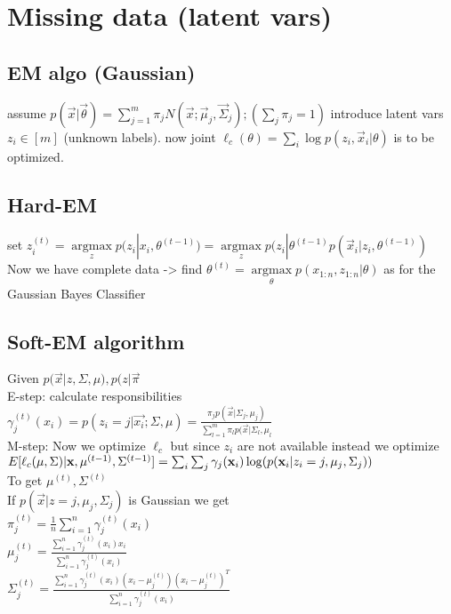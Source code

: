 \section*{Missing data (latent vars)}
\subsection*{EM algo (Gaussian)}
assume $p(\vec{x}|\vec{\theta
})=\sum_{j=1}^m \pi_j N(\vec{x}; \vec{\mu}_j, \vec{\Sigma}_j);
(\sum_j \pi_j = 1)$
introduce latent vars $z_i\in[m]$ (unknown labels). now joint
$\ell_c(\theta)=\sum_i \log p(z_i,\vec{x}_i|\theta)$
is to be optimized.

\subsection*{Hard-EM}
set $z_i^{(t)} = \underset{z}{\operatorname{argmax}}p(z_i|x_i, \theta^{(t-1)}) = \underset{z}{\operatorname{argmax}}p(z_i|\theta^{(t-1)}p(\vec{x}_i|z_i, \theta^{(t-1)})$ 
Now we have complete data -> find $\theta^{(t)} = \underset{\theta}{\operatorname{argmax}}p(x_{1:n},z_{1:n}|\theta)$
as for the Gaussian Bayes Classifier

\subsection*{Soft-EM algorithm}
Given $p(\vec{x}|z,\Sigma,\mu), p(z | \vec{\pi}$\\
E-step: calculate responsibilities \\
$\gamma_j^{(t)}(x_i) = p(z_i = j|\vec{x_i};\Sigma,\mu)=\frac{\pi_j p(\vec{x}|\Sigma_j, \mu_j)}{\sum_{l=1}^m \pi_l p(\vec{x}|\Sigma_l, \mu_l}$\\

M-step: Now we optimize $\ell_c$ but since $z_i$ are not available instead we optimize\\
$E[\ell_c(\mu,\Sigma)|\vec{x},\mu^{(t-1)},\Sigma^{(t-1)}] \\
= \sum_i \sum_j \gamma_j(\vec{x}_i) \log(p(\vec{x}_i|z_i=j, \mu_j, \Sigma_j))$\\
To get $\mu^{(t)}, \Sigma^{(t)}$ \\
If $p(\vec{x}|z=j, \mu_j, \Sigma_j)$ is Gaussian we get\\
$\pi_j^{(t)} = \frac{1}{n} \sum_{i=1}^n \gamma_j^{(t)} (x_i)$\\
$\mu_j^{(t)} = \frac{\sum_{i=1}^n \gamma_j^{(t)} (x_i) x_i}{\sum_{i=1}^n \gamma_j^{(t)} (x_i)}$\\
$\Sigma_j^{(t)} = \frac{\sum_{i=1}^n \gamma_j^{(t)}(x_i) (x_i - \mu_j^{(t)}) (x_i - \mu_j^{(t)})^T}{\sum_{i=1}^n \gamma_j^{(t)}(x_i)}$